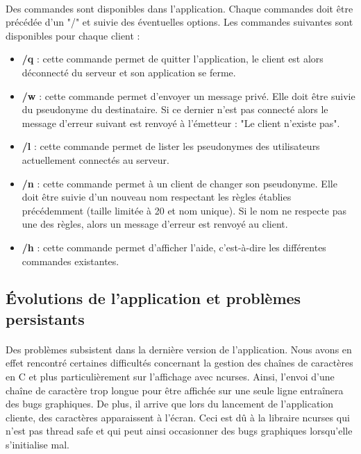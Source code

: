         \paragraph{}
        Des commandes sont disponibles dans l'application. Chaque commandes doit être précédée d'un "/" et suivie des éventuelles options. Les commandes suivantes sont disponibles pour chaque client :
        \begin{itemize}
            \item \textbf{/q} : cette commande permet de quitter l'application, le client est alors déconnecté du serveur et son application se ferme.
            
            \item \textbf{/w} : cette commande permet d'envoyer un message privé. Elle doit être suivie du pseudonyme du destinataire. Si ce dernier n'est pas connecté alors le message d'erreur suivant est renvoyé à l'émetteur : "Le client n'existe pas".
            
            \item \textbf{/l} : cette commande permet de lister les pseudonymes des utilisateurs actuellement connectés au serveur.
            
            \item \textbf{/n} : cette commande permet à un client de changer son pseudonyme. Elle doit être suivie d'un nouveau nom respectant les règles établies précédemment (taille limitée à 20 et nom unique). Si le nom ne respecte pas une des règles, alors un message d'erreur est renvoyé au client.
            
            \item \textbf{/h} : cette commande permet d'afficher l'aide, c'est-à-dire les différentes commandes existantes.
        \end{itemize}
    
    \subsection{Évolutions de l'application et problèmes persistants}
        \paragraph{}
        Des problèmes subsistent dans la dernière version de l'application. Nous avons en effet rencontré certaines difficultés concernant la gestion des chaînes de caractères en C et plus particulièrement sur l'affichage avec ncurses. Ainsi, l'envoi d'une chaîne de caractère trop longue pour être affichée sur une seule ligne entraînera des bugs graphiques. De plus, il arrive que lors du lancement de l'application cliente, des caractères apparaissent à l'écran. Ceci est dû à la libraire ncurses qui n'est pas thread safe et qui peut ainsi occasionner des bugs graphiques lorsqu'elle s'initialise mal. 
        
